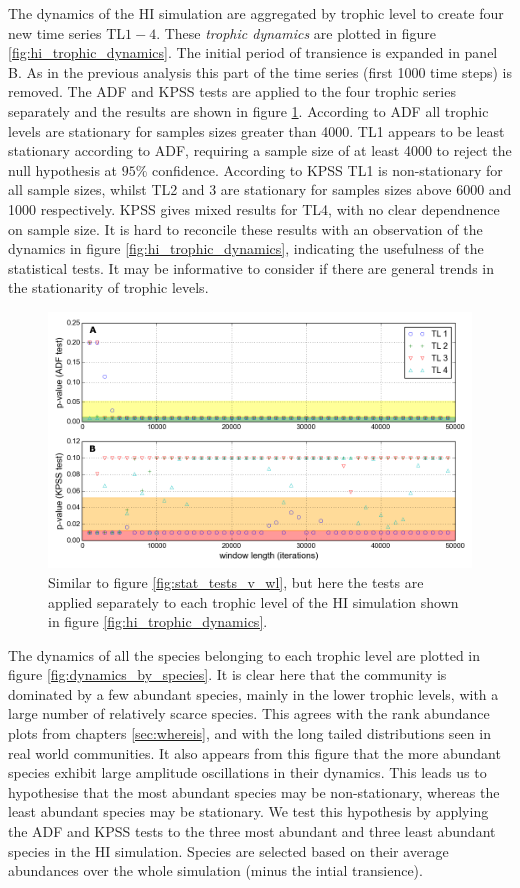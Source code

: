 The dynamics of the HI simulation are aggregated by trophic level to create four new time series TL$1-4$. These \emph{trophic dynamics} are plotted in figure \ref{fig:hi_trophic_dynamics}. The initial period of transience is expanded in panel B. As in the previous analysis this part of the time series (first 1000 time steps) is removed. The ADF and KPSS tests are applied to the four trophic series separately and the results are shown in figure \ref{fig:tl_stat_tests_v_wl}. According to ADF all trophic levels are stationary for samples sizes greater than 4000. TL1 appears to be least stationary according to ADF, requiring a sample size of at least 4000 to reject the null hypothesis at $95\%$ confidence. According to KPSS TL1 is non-stationary for all sample sizes, whilst TL2 and 3 are stationary for samples sizes above 6000 and 1000 respectively. KPSS gives mixed results for TL4, with no clear dependnence on sample size. It is hard to reconcile these results with an observation of the dynamics in figure \ref{fig:hi_trophic_dynamics}, indicating the usefulness of the statistical tests. It may be informative to consider if there are general trends in the stationarity of trophic levels.

\begin{figure}[h!]
	\centering
	\includegraphics[width=0.8\linewidth]{"./chapters/chapter04b/figures/Rtests/tl_stat_tests_v_wl"}
     \caption{Similar to figure \ref{fig:stat_tests_v_wl}, but here the tests are applied separately to each trophic level of the HI simulation shown in figure \ref{fig:hi_trophic_dynamics}.} 
     \label{fig:tl_stat_tests_v_wl}   
\end{figure}

The dynamics of all the species belonging to each trophic level are plotted in figure \ref{fig:dynamics_by_species}. It is clear here that the community is dominated by a few abundant species, mainly in the lower trophic levels, with a large number of relatively scarce species. This agrees with the rank abundance plots from chapters \ref{sec:whereis}, and with the long tailed distributions seen in real world communities. It also appears from this figure that the more abundant species exhibit large amplitude oscillations in their dynamics. This leads us to hypothesise that the most abundant species may be non-stationary, whereas the least abundant species may be stationary. We test this hypothesis by applying the ADF and KPSS tests to the three most abundant and three least abundant species in the HI simulation. Species are selected based on their average abundances over the whole simulation (minus the intial transience).  


